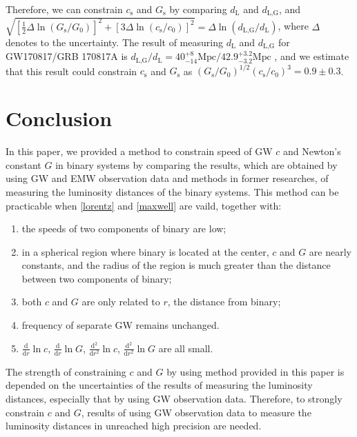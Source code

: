 \documentclass{article}
\def\d{\mathrm{d}}
\begin{document}
Therefore, we can constrain $c_\text{s}$ and $G_\text{s}$ by comparing $d_\text{L}$ and $d_\text{L,G}$, and $\sqrt{[\frac{1}{2}\Delta\!\ln(G_\text{s}/G_0)]^2+[3\Delta\!\ln(c_\text{s}/c_0)]^2}=\Delta\!\ln(d_\text{L,G}/d_\text{L})$, where $\Delta$ denotes to the uncertainty. The result of measuring $d_\text{L}$ and $d_\text{L,G}$ for GW170817/GRB 170817A is $d_\text{L,G}/d_\text{L}=40_{-14}^{+8}\text{Mpc}/42.9_{-3.2}^{+3.2}\text{Mpc}$ \cite{Abbott2017}, and we estimate that this result could constrain $c_\text{s}$ and $G_\text{s}$ as $(G_\text{s}/G_0)^{1/2}(c_\text{s}/c_0)^3=0.9 \pm 0.3$.

\section{Conclusion}
In this paper, we provided a method to constrain speed of GW $c$ and Newton's constant $G$ in binary systems by comparing the results, which are obtained by using GW and EMW observation data and methods in former researches, of measuring the luminosity distances of the binary systems. This method can be practicable when \eqref{lorentz} and \eqref{maxwell} are vaild, together with:
\begin{enumerate}
    \item the speeds of two components of binary are low;
    \item in a spherical region where binary is located at the center, $c$ and $G$ are nearly constants, and the radius of the region is much greater than the distance between two components of binary;
    \item both $c$ and $G$ are only related to $r$, the distance from binary;
    \item frequency of separate GW remains unchanged.
    \item $\frac{\d}{\d r}\ln c$, $\frac{\d}{\d r}\ln G$, $\frac{\d^2}{\d r^2}\ln c$, $\frac{\d^2}{\d r^2}\ln G$ are all small.
\end{enumerate}
The strength of constraining $c$ and $G$ by using method provided in this paper is depended on the uncertainties of the results of measuring the luminosity distances, especially that by using GW observation data. Therefore, to strongly constrain $c$ and $G$, results of using GW observation data to measure the luminosity distances in unreached high precision are needed.



\end{document}
